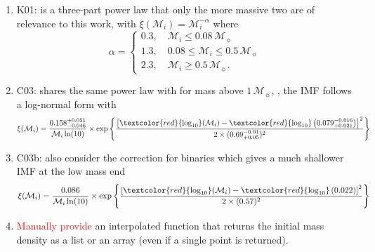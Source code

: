 \documentclass[fleqn,usenatbib]{rasti}
\newcommand{\msun}{\mathcal{M}_{\sun}}
\begin{document}
\begin{enumerate}
    \item K01: \citet{2001MNRAS.322..231K} is a three-part power law that only the
    more massive two are of relevance to this work, with
    $\xi(\mathcal{M}_i) = \mathcal{M}_i^{-\alpha}$ where
    \begin{equation}
        \alpha =
        \begin{cases}
            0.3, \quad \mathcal{M}_i \leq 0.08\,\msun\\
            1.3, \quad 0.08 \leq \mathcal{M}_i \leq 0.5\,\msun\\
            2.3, \quad \mathcal{M}_i \geq 0.5\,\msun.
        \end{cases}
    \end{equation}
    \item C03: \citet{2003PASP..115..763C} shares the same power law with
    \citet{2001MNRAS.322..231K} for mass above $1\,\msun$, \textcolor{below that},
    the IMF follows a log-normal form with
    \begin{equation}
        \xi(\mathcal{M}_i) = \dfrac{0.158^{+0.051}_{-0.046}}{\mathcal{M}_i \ln(10)} \times
            \exp{\left\{\dfrac{\left[\textcolor{red}{\log_{10}}(\mathcal{M}_i) - \textcolor{red}{\log_{10}}\left(0.079^{-0.016}_{+0.021}\right)\right]^2}{2 \times (0.69^{-0.01}_{+0.05})^2}\right\}}
    \end{equation}
    \item C03b: \citet[][including binary]{2003PASP..115..763C} also consider the correction for binaries which gives a much shallower IMF at the low mass end
    \begin{equation}
        \xi(\mathcal{M}_i) = \dfrac{0.086}{\mathcal{M}_i \ln(10)} \times
            \exp{\left\{\dfrac{\left[\textcolor{red}{\log_{10}}(\mathcal{M}_i) - \textcolor{red}{\log_{10}}\left(0.022\right)\right]^2}{2 \times (0.57)^2}\right\}}
    \end{equation}
    \item \textcolor{red}{Manually provide} an interpolated function that returns the initial mass density as a list or an array (even if a single point is returned).
\end{enumerate}
\end{document}
